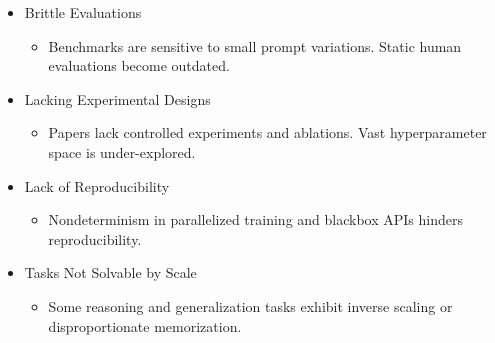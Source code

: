 \begin{itemize}

\item Brittle Evaluations
\begin{itemize}
\item Benchmarks are sensitive to small prompt variations. Static human evaluations become outdated.
\end{itemize}

\item Lacking Experimental Designs
\begin{itemize}

\item Papers lack controlled experiments and ablations. Vast hyperparameter space is under-explored.
\end{itemize}

\item Lack of Reproducibility
\begin{itemize}
\item Nondeterminism in parallelized training and blackbox APIs hinders reproducibility.
\end{itemize}

\item Tasks Not Solvable by Scale
\begin{itemize}
\item Some reasoning and generalization tasks exhibit inverse scaling or disproportionate memorization.

\end{itemize}

\end{itemize}
